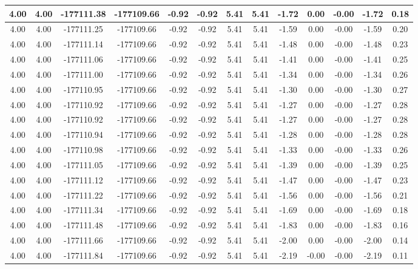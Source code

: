 \begin{table}[htbp]
\begin{adjustbox}{angle=90}
\begin{tabular}{|c|c|c|c|c|c|c|c|c|c|c|c|c|}
 4.00 & 4.00 & -177111.38 & -177109.66 & -0.92 & -0.92 & 5.41 & 5.41 & -1.72 & 0.00 & -0.00 & -1.72 & 0.18\\ \hline
 4.00 & 4.00 & -177111.25 & -177109.66 & -0.92 & -0.92 & 5.41 & 5.41 & -1.59 & 0.00 & -0.00 & -1.59 & 0.20\\ \hline
 4.00 & 4.00 & -177111.14 & -177109.66 & -0.92 & -0.92 & 5.41 & 5.41 & -1.48 & 0.00 & -0.00 & -1.48 & 0.23\\ \hline
 4.00 & 4.00 & -177111.06 & -177109.66 & -0.92 & -0.92 & 5.41 & 5.41 & -1.41 & 0.00 & -0.00 & -1.41 & 0.25\\ \hline
 4.00 & 4.00 & -177111.00 & -177109.66 & -0.92 & -0.92 & 5.41 & 5.41 & -1.34 & 0.00 & -0.00 & -1.34 & 0.26\\ \hline
 4.00 & 4.00 & -177110.95 & -177109.66 & -0.92 & -0.92 & 5.41 & 5.41 & -1.30 & 0.00 & -0.00 & -1.30 & 0.27\\ \hline
 4.00 & 4.00 & -177110.92 & -177109.66 & -0.92 & -0.92 & 5.41 & 5.41 & -1.27 & 0.00 & -0.00 & -1.27 & 0.28\\ \hline
 4.00 & 4.00 & -177110.92 & -177109.66 & -0.92 & -0.92 & 5.41 & 5.41 & -1.27 & 0.00 & -0.00 & -1.27 & 0.28\\ \hline
 4.00 & 4.00 & -177110.94 & -177109.66 & -0.92 & -0.92 & 5.41 & 5.41 & -1.28 & 0.00 & -0.00 & -1.28 & 0.28\\ \hline
 4.00 & 4.00 & -177110.98 & -177109.66 & -0.92 & -0.92 & 5.41 & 5.41 & -1.33 & 0.00 & -0.00 & -1.33 & 0.26\\ \hline
 4.00 & 4.00 & -177111.05 & -177109.66 & -0.92 & -0.92 & 5.41 & 5.41 & -1.39 & 0.00 & -0.00 & -1.39 & 0.25\\ \hline
 4.00 & 4.00 & -177111.12 & -177109.66 & -0.92 & -0.92 & 5.41 & 5.41 & -1.47 & 0.00 & -0.00 & -1.47 & 0.23\\ \hline
 4.00 & 4.00 & -177111.22 & -177109.66 & -0.92 & -0.92 & 5.41 & 5.41 & -1.56 & 0.00 & -0.00 & -1.56 & 0.21\\ \hline
 4.00 & 4.00 & -177111.34 & -177109.66 & -0.92 & -0.92 & 5.41 & 5.41 & -1.69 & 0.00 & -0.00 & -1.69 & 0.18\\ \hline
 4.00 & 4.00 & -177111.48 & -177109.66 & -0.92 & -0.92 & 5.41 & 5.41 & -1.83 & 0.00 & -0.00 & -1.83 & 0.16\\ \hline
 4.00 & 4.00 & -177111.66 & -177109.66 & -0.92 & -0.92 & 5.41 & 5.41 & -2.00 & 0.00 & -0.00 & -2.00 & 0.14\\ \hline
 4.00 & 4.00 & -177111.84 & -177109.66 & -0.92 & -0.92 & 5.41 & 5.41 & -2.19 & -0.00 & -0.00 & -2.19 & 0.11\\ \hline

\end{tabular}
\end{adjustbox}
\end{table}
